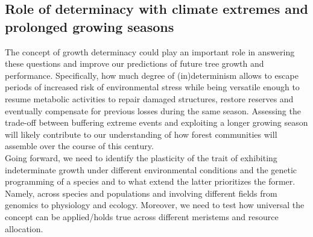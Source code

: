 \documentclass{article}
\begin{document}
\subsection*{Role of determinacy with climate extremes and prolonged growing seasons} %
The concept of growth determinacy could play an important role in answering these questions and improve our predictions of future tree growth and performance. Specifically, how much degree of (in)determinism allows to escape periods of increased risk of environmental stress while being versatile enough to resume metabolic activities to repair damaged structures, restore reserves and eventually compensate for previous losses during the same season. Assessing the trade-off between buffering extreme events and exploiting a longer growing season will likely contribute to our understanding of how forest communities will assemble over the course of this century.\\

Going forward, we need to identify the plasticity of the trait of exhibiting indeterminate growth under different environmental conditions and the genetic programming of a species and to what extend the latter prioritizes the former. Namely, across species and populations and involving different fields from genomics to physiology and ecology. Moreover, we need to test how universal the concept can be applied/holds true across different meristems and resource allocation. 
\end{document}
